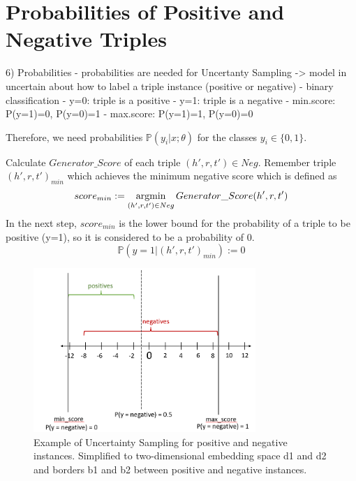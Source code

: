 \section{Probabilities of Positive and Negative Triples} 
\label{sec:probabilities}


6) Probabilities 
- probabilities are needed for Uncertanty Sampling 
-> model in uncertain about how to label a triple instance (positive or negative)
- binary classification
- y=0: triple is a positive
- y=1: triple is a negative
- min.score: P(y=1)=0, P(y=0)=1 
- max.score: P(y=1)=1, P(y=0)=0


Therefore, we need probabilities $\mathds{P}(y_i | x; \theta)$ for the classes $y_i \in \{0, 1\}$.

Calculate $Generator\_Score$ of each triple $(h',r,t') \in Neg$.
Remember triple $(h',r,t')_{min}$ which achieves the minimum negative score which is defined as
\begin{equation}
    score_{min} := \operatorname*{argmin}_{(h', r, t') \in Neg}{Generator\_Score(h', r, t')}
\end{equation}
In the next step, $score_{min}$ is the lower bound for the probability of a triple to be positive (y=1), so it is considered to be a probability of 0.
\begin{equation}
    \mathds{P}(y = 1|(h', r, t')_{min}) := 0
\end{equation}

\begin{figure}[t]
  \centering
    \includegraphics[width=0.75\textwidth]{figures/positives_negatives1.PNG}
  \caption{Example of Uncertainty Sampling for positive and negative instances. Simplified to two-dimensional embedding space d1 and d2 and borders b1 and b2 between positive and negative instances.}
  \label{fig:informativeinstances}
\end{figure}


